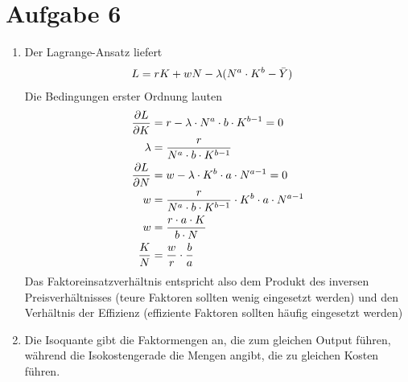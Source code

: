 \documentclass{article}
\begin{document}
	\section*{Aufgabe 6}
	\begin{enumerate}[label=(\alph*)]
		\item Der Lagrange-Ansatz liefert
		\begin{align}
			L &= rK + wN - \lambda(N^a\cdot K^b - \bar{Y}) \notag
		\end{align}
		Die Bedingungen erster Ordnung lauten
		\begin{align}
			\frac{\partial L}{\partial K} &= r-\lambda\cdot N^a\cdot b\cdot K^{b-1} = 0 \notag \\
			\lambda &= \frac{r}{N^a\cdot b\cdot K^{b-1}} \notag \\
			\frac{\partial L}{\partial N} &= w-\lambda\cdot K^b\cdot a\cdot N^{a-1} = 0 \notag \\
			w &= \frac{r}{N^a\cdot b\cdot K^{b-1}}\cdot K^b\cdot a\cdot N^{a-1} \notag \\
			w &= \frac{r\cdot a\cdot K}{b\cdot N} \notag \\
			\frac{K}{N} &= \frac{w}{r} \cdot\frac{b}{a} \notag
		\end{align}
		Das Faktoreinsatzverhältnis entspricht also dem Produkt des inversen Preisverhältnisses (teure Faktoren sollten wenig eingesetzt werden) und den Verhältnis der Effizienz (effiziente Faktoren sollten häufig eingesetzt werden)
		\item Die Isoquante gibt die Faktormengen an, die zum gleichen Output führen, während die Isokostengerade die Mengen angibt, die zu gleichen Kosten führen.
		\begin{center}
\end{center}
\end{enumerate}
\end{document}
